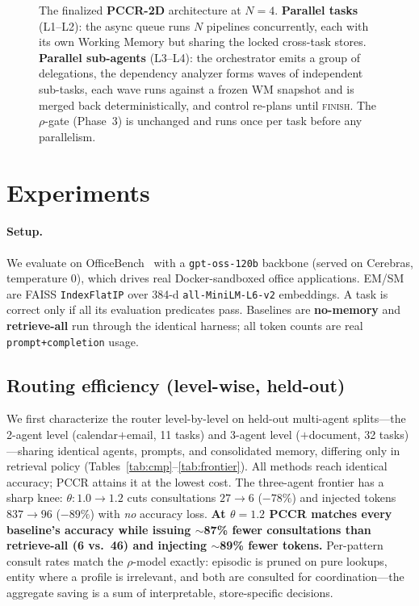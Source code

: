 \documentclass[10pt,twocolumn]{article}
\newcommand{\code}[1]{\texttt{\small #1}}
\begin{document}
\begin{figure}[t]
{%
}
\caption{The finalized \textbf{PCCR-2D} architecture at $N{=}4$. \textbf{Parallel tasks}
(L1--L2): the async queue runs $N$ pipelines concurrently, each with its own Working Memory but sharing
the locked cross-task stores. \textbf{Parallel sub-agents} (L3--L4): the orchestrator emits a group of
delegations, the dependency analyzer forms waves of independent sub-tasks, each wave runs against a
frozen WM snapshot and is merged back deterministically, and control re-plans until \textsc{finish}.
The $\rho$-gate (Phase~3) is unchanged and runs once per task before any parallelism.}
\label{fig:arch}
\end{figure}

\section{Experiments}\label{sec:results}
\paragraph{Setup.} We evaluate on OfficeBench~\cite{officebench} with a \code{gpt-oss-120b} backbone
(served on Cerebras, temperature 0), which drives real Docker-sandboxed office applications. EM/SM are
FAISS \code{IndexFlatIP} over 384-d \code{all-MiniLM-L6-v2} embeddings. A task is correct only if all
its evaluation predicates pass. Baselines are \textbf{no-memory} and \textbf{retrieve-all} run through
the identical harness; all token counts are real \code{prompt+completion} usage.

\subsection{Routing efficiency (level-wise, held-out)}\label{sec:routing}
We first characterize the router level-by-level on held-out multi-agent splits---the 2-agent level
(calendar$+$email, 11 tasks) and 3-agent level ($+$document, 32 tasks)---sharing identical agents,
prompts, and consolidated memory, differing only in retrieval policy (Tables~\ref{tab:cmp}--\ref{tab:frontier}).
All methods reach identical accuracy; PCCR attains it at the lowest cost. The three-agent frontier has
a sharp knee: $\theta{:}1.0{\to}1.2$ cuts consultations $27{\to}6$ ($-78\%$) and injected tokens
$837{\to}96$ ($-89\%$) with \emph{no} accuracy loss. \textbf{At $\theta{=}1.2$ PCCR matches every
baseline's accuracy while issuing $\sim$87\% fewer consultations than retrieve-all (6 vs.\ 46) and
injecting $\sim$89\% fewer tokens.} Per-pattern consult rates match the $\rho$-model exactly: episodic
is pruned on pure lookups, entity where a profile is irrelevant, and both are consulted for
coordination---the aggregate saving is a sum of interpretable, store-specific decisions.
\end{document}
